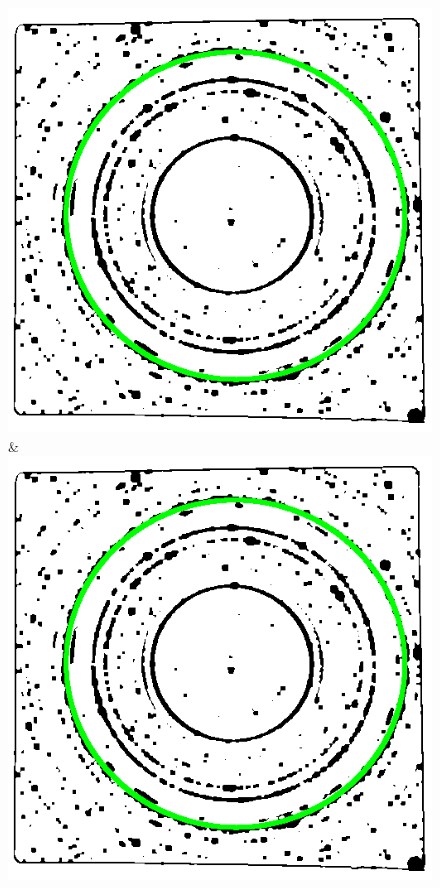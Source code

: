 \documentclass[preprint]{iucr}              %
\begin{document}
\begin{figure}
\begin{tabular}
\includegraphics[width=\linewidth]{Detail/o_Si12_0002_E_2_6.png}&
\includegraphics[width=\linewidth]{Detail/o_Si12_0002_EF_2_7.png}
\\

\end{tabular}
\end{figure}
\end{document}
